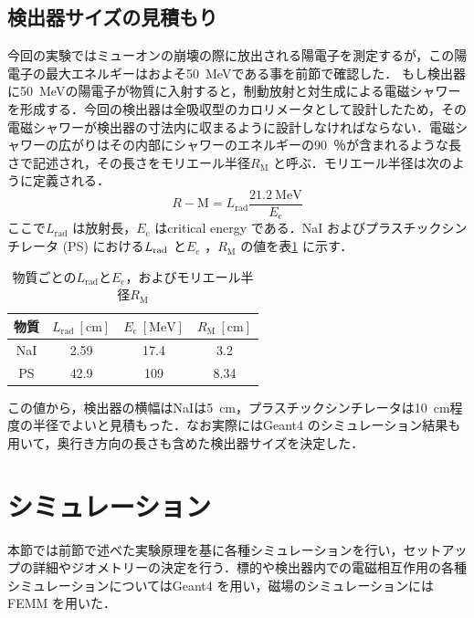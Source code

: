 \subsection{検出器サイズの見積もり}
今回の実験ではミューオンの崩壊の際に放出される陽電子を測定するが，この陽電子の最大エネルギーはおよそ50~MeVである事を前節で確認した．
もし検出器に50~MeVの陽電子が物質に入射すると，制動放射と対生成による電磁シャワーを形成する．今回の検出器は全吸収型のカロリメータとして設計したため，その電磁シャワーが検出器の寸法内に収まるように設計しなければならない．電磁シャワーの広がりはその内部にシャワーのエネルギーの90~％が含まれるような長さで記述され，その長さをモリエール半径$R_\mathrm{M}$ と呼ぶ．モリエール半径は次のように定義される．
\begin{equation}
R-\mathrm{M} = L_\mathrm{rad}\frac{21.2~\mathrm{MeV}}{E_\mathrm{c}}
\end{equation}
ここで$L_\mathrm{rad}$ は放射長，$E_\mathrm{c}$ はcritical energy である．NaI およびプラスチックシンチレータ (PS) における$L_{\rm rad}$ と$E_\mathrm{c}$ ，$R_\mathrm{M}$ の値を表\ref{tab:abe_rm} に示す．
\begin{table}[hbtp]
\centering
\begin{tabular}{cccc}\toprule
物質 & $L_\mathrm{rad}~[\mathrm{cm}]$ & $E_\mathrm{c}~[\mathrm{MeV}]$ & $R_\mathrm{M}~[\mathrm{cm}]$ \\ \midrule
NaI & 2.59 & 17.4 & 3.2 \\
PS & 42.9 & 109 & 8.34 \\ \bottomrule
\end{tabular}
\caption{物質ごとの$L_\mathrm{rad}$と$E_\mathrm{c}$，およびモリエール半径$R_\mathrm{M}$}
\label{tab:abe_rm}
\end{table}
この値から，検出器の横幅はNaIは5~cm，プラスチックシンチレータは10~cm程度の半径でよいと見積もった．なお実際にはGeant4 のシミュレーション結果も用いて，奥行き方向の長さも含めた検出器サイズを決定した．
\newpage

\section{シミュレーション}%
本節では前節で述べた実験原理を基に各種シミュレーションを行い，セットアップの詳細やジオメトリーの決定を行う．標的や検出器内での電磁相互作用の各種シミュレーションについてはGeant4 を用い，磁場のシミュレーションにはFEMM を用いた．
	
